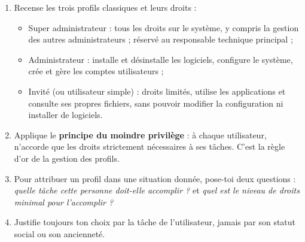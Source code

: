 \documentclass[11pt]{article}
\newcommand{\cle}[1]{{\popxbold\color{popdark}#1}}
\begin{document}
\begin{methode}
\begin{enumerate}
  \item Recense les trois profils classiques et leurs droits :
  \begin{itemize}
    \item \cle{Super administrateur} : tous les droits sur le système, y compris la gestion des autres administrateurs ; réservé au responsable technique principal ;
    \item \cle{Administrateur} : installe et désinstalle les logiciels, configure le système, crée et gère les comptes utilisateurs ;
    \item \cle{Invité} (ou utilisateur simple) : droits limités, utilise les applications et consulte ses propres fichiers, sans pouvoir modifier la configuration ni installer de logiciels.
  \end{itemize}
  \item Applique le \textbf{principe du moindre privilège} : à chaque utilisateur, n'accorde que les droits strictement nécessaires à ses tâches. C'est la règle d'or de la gestion des profils.
  \item Pour attribuer un profil dans une situation donnée, pose-toi deux questions : \emph{quelle tâche cette personne doit-elle accomplir ?} et \emph{quel est le niveau de droits minimal pour l'accomplir ?}
  \item Justifie toujours ton choix par la tâche de l'utilisateur, jamais par son statut social ou son ancienneté.
\end{enumerate}
\end{methode}
\end{document}
